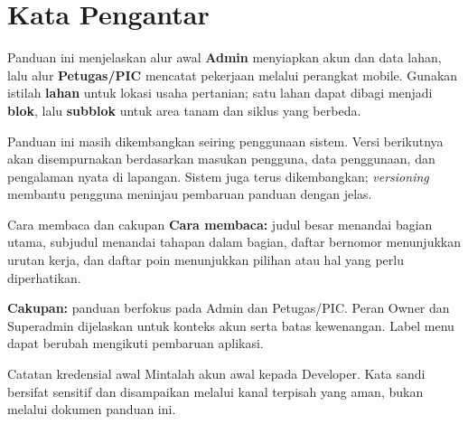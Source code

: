 \section*{Kata Pengantar}

Panduan ini menjelaskan alur awal \textbf{Admin} menyiapkan akun dan data lahan, lalu alur \textbf{Petugas/PIC} mencatat pekerjaan melalui perangkat mobile. Gunakan istilah \textbf{lahan} untuk lokasi usaha pertanian; satu lahan dapat dibagi menjadi \textbf{blok}, lalu \textbf{subblok} untuk area tanam dan siklus yang berbeda.

Panduan ini masih dikembangkan seiring penggunaan sistem. Versi berikutnya akan disempurnakan berdasarkan masukan pengguna, data penggunaan, dan pengalaman nyata di lapangan. Sistem juga terus dikembangkan; \emph{versioning} membantu pengguna meninjau pembaruan panduan dengan jelas.

\begin{guidebox}{Cara membaca dan cakupan}
  \textbf{Cara membaca:} judul besar menandai bagian utama, subjudul menandai tahapan dalam bagian, daftar bernomor menunjukkan urutan kerja, dan daftar poin menunjukkan pilihan atau hal yang perlu diperhatikan.

  \textbf{Cakupan:} panduan berfokus pada Admin dan Petugas/PIC. Peran Owner dan Superadmin dijelaskan untuk konteks akun serta batas kewenangan. Label menu dapat berubah mengikuti pembaruan aplikasi.
\end{guidebox}

\begin{guidebox}{Catatan kredensial awal}
  Mintalah akun awal kepada Developer. Kata sandi bersifat sensitif dan disampaikan melalui kanal terpisah yang aman, bukan melalui dokumen panduan ini.
\end{guidebox}
